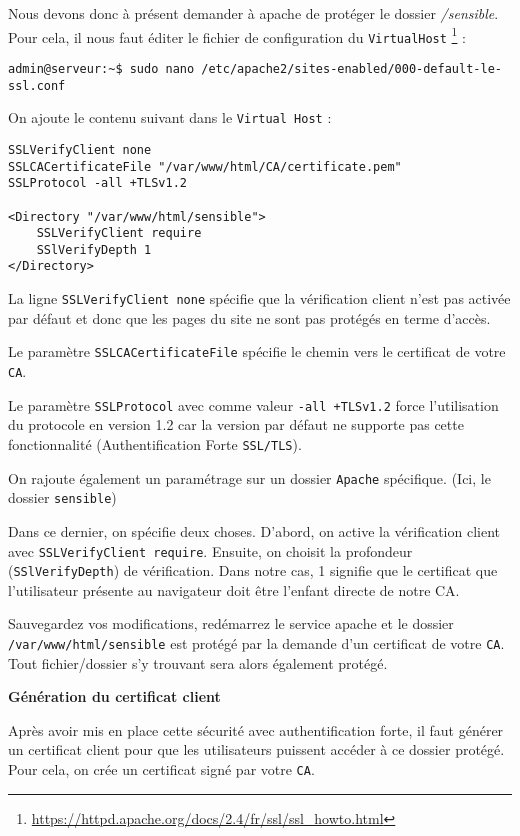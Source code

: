 Nous devons donc à présent demander à apache de protéger le dossier 
\emph{/sensible}. Pour cela, il nous faut éditer le fichier de configuration du \texttt{VirtualHost} \footnote{\url{https://httpd.apache.org/docs/2.4/fr/ssl/ssl_howto.html}} : 
\begin{verbatim}
admin@serveur:~$ sudo nano /etc/apache2/sites-enabled/000-default-le-ssl.conf
\end{verbatim}

On ajoute le contenu suivant dans le \texttt{Virtual Host} :

\begin{verbatim}
SSLVerifyClient none
SSLCACertificateFile "/var/www/html/CA/certificate.pem"
SSLProtocol -all +TLSv1.2

<Directory "/var/www/html/sensible">
    SSLVerifyClient require
    SSlVerifyDepth 1
</Directory>
\end{verbatim}

La ligne \texttt{SSLVerifyClient none} spécifie que la vérification client n'est pas activée par défaut et donc que les pages du site ne sont pas protégés en terme d'accès.

Le paramètre \texttt{SSLCACertificateFile} spécifie le chemin vers le certificat de votre \texttt{CA}.

Le paramètre \texttt{SSLProtocol} avec comme valeur \texttt{-all +TLSv1.2} force l'utilisation du protocole en version 1.2 car la version par défaut ne supporte pas cette fonctionnalité (Authentification Forte \texttt{SSL/TLS}).

On rajoute également un paramétrage sur un dossier \texttt{Apache} spécifique. (Ici, le dossier \texttt{sensible})

Dans ce dernier, on spécifie deux choses. D'abord, on active la vérification client avec \texttt{SSLVerifyClient require}. Ensuite, on choisit la profondeur (\texttt{SSlVerifyDepth}) de vérification. Dans notre cas, 1 signifie que le certificat que l'utilisateur présente au navigateur doit être l'enfant directe de notre CA.

Sauvegardez vos modifications, redémarrez le service apache et le dossier \texttt{/var/www/html/sensible} est protégé par la demande d'un certificat de votre \texttt{CA}. Tout fichier/dossier s'y trouvant sera alors également protégé. 

\newpage
\textbf{Génération du certificat client}

Après avoir mis en place cette sécurité avec authentification forte, il faut générer un certificat client pour que les utilisateurs puissent accéder à ce dossier protégé. Pour cela, on crée un certificat signé par votre \texttt{CA}.

